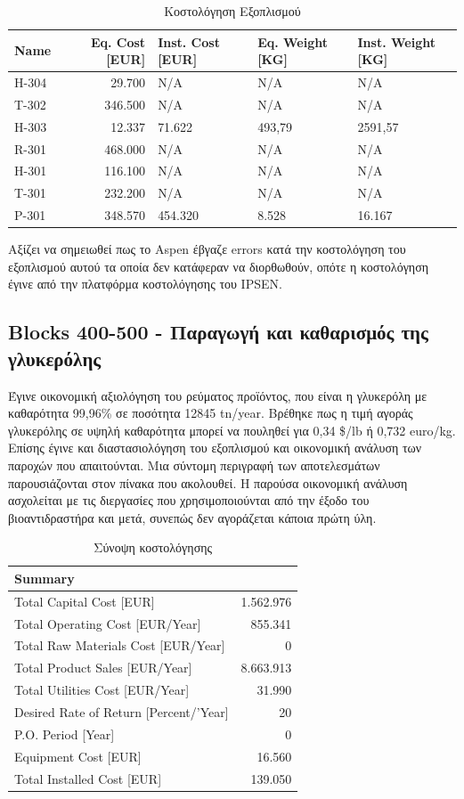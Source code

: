 \documentclass[11pt]{article}
\begin{document}
\begin{table}[htbp]
\caption{Κοστολόγηση Εξοπλισμού}
\centering
\begin{tabular}{lrlll}
Name & Eq. Cost [EUR] & Inst. Cost [EUR] & Eq. Weight [KG] & Inst. Weight [KG]\\
\hline
H-304 & 29.700 & N/A & N/A & N/A\\
T-302 & 346.500 & N/A & N/A & N/A\\
H-303 & 12.337 & 71.622 & 493,79 & 2591,57\\
R-301 & 468.000 & N/A & N/A & N/A\\
H-301 & 116.100 & N/A & N/A & N/A\\
T-301 & 232.200 & N/A & N/A & N/A\\
P-301 & 348.570 & 454.320 & 8.528 & 16.167\\
\end{tabular}
\end{table}

Αξίζει να σημειωθεί πως το Aspen έβγαζε errors κατά την κοστολόγηση του εξοπλισμού αυτού τα οποία δεν κατάφεραν να διορθωθούν, οπότε η κοστολόγηση έγινε από την πλατφόρμα κοστολόγησης του IPSEN.

\subsection{Blocks 400-500 - Παραγωγή και καθαρισμός της γλυκερόλης}
\label{sec:orgff4ec78}
Έγινε οικονομική αξιολόγηση του ρεύματος προϊόντος, που είναι η
γλυκερόλη με καθαρότητα 99,96\% σε ποσότητα 12845 tn/year. Βρέθηκε
πως η τιμή αγοράς γλυκερόλης σε υψηλή καθαρότητα μπορεί να πουληθεί
για 0,34 \$/lb ή 0,732 euro/kg. Επίσης έγινε και διαστασιολόγηση του
εξοπλισμού και οικονομική ανάλυση των παροχών που απαιτούνται. Μια
σύντομη περιγραφή των αποτελεσμάτων παρουσιάζονται στον πίνακα που
ακολουθεί. Η παρούσα οικονομική ανάλυση ασχολείται με τις διεργασίες που
χρησιμοποιούνται από την έξοδο του βιοαντιδραστήρα και μετά, συνεπώς δεν
αγοράζεται κάποια πρώτη ύλη.

\begin{table}[htbp]
\caption{Σύνοψη κοστολόγησης}
\centering
\begin{tabular}{lr}
Summary & \\
\hline
Total Capital Cost [EUR] & 1.562.976\\
Total Operating Cost [EUR/Year] & 855.341\\
Total Raw Materials Cost [EUR/Year] & 0\\
Total Product Sales [EUR/Year] & 8.663.913\\
Total Utilities Cost [EUR/Year] & 31.990\\
Desired Rate of Return [Percent/'Year] & 20\\
P.O. Period [Year] & 0\\
Equipment Cost [EUR] & 16.560\\
Total Installed Cost [EUR] & 139.050\\
\end{tabular}
\end{table}
\end{document}
